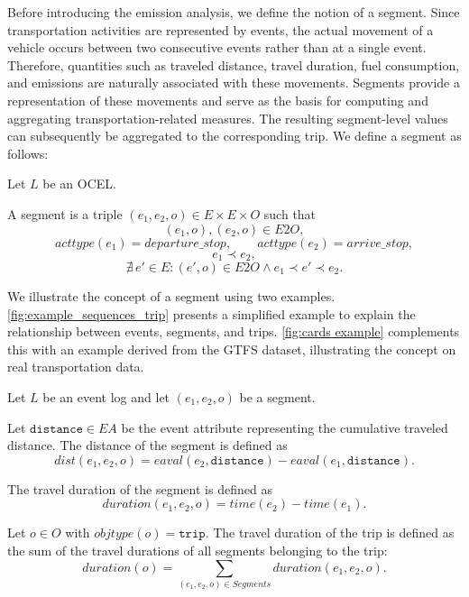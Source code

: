 Before introducing the emission analysis, we define the notion of a segment. Since transportation activities are represented by events, the actual movement of a vehicle occurs between two consecutive events rather than at a single event. Therefore, quantities such as traveled distance, travel duration, fuel consumption, and emissions are naturally associated with these movements. Segments provide a representation of these movements and serve as the basis for computing and aggregating transportation-related measures. The resulting segment-level values can subsequently be aggregated to the corresponding trip. We define a segment as follows: 
\begin{definition}[Segment]
Let $L$ be an OCEL.

A segment is a triple $(e_1,e_2,o)\in E\times E\times O$ such that
\[
(e_1,o),(e_2,o)\in E2O,
\]
\[
\mathit{acttype}(e_1)=\textit{departure\_stop},
\qquad
\mathit{acttype}(e_2)=\textit{arrive\_stop},
\]
\[
e_1 \prec e_2,
\]
\[
\nexists\, e'\in E:
(e',o)\in E2O
\land
e_1\prec e'\prec e_2.
\]
\label{def:segments}
\end{definition}
We illustrate the concept of a segment using two examples. \autoref{fig:example_sequences_trip} presents a simplified example to explain the relationship between events, segments, and trips. \autoref{fig:cards example} complements this with an example derived from the GTFS dataset, illustrating the concept on real transportation data.

\begin{definition}
Let $L$ be an event log and let $(e_1,e_2,o)$ be a segment.

Let $\texttt{distance}\in EA$ be the event attribute representing the cumulative traveled distance. The distance of the segment is defined as
\begin{equation}
dist(e_1,e_2,o)
=
eaval(e_2,\texttt{distance})
-
eaval(e_1,\texttt{distance}).
\end{equation}

The travel duration of the segment is defined as
\begin{equation}
duration(e_1,e_2,o)
=
time(e_2)-time(e_1).
\end{equation}

Let $o\in O$ with $objtype(o)=\texttt{trip}$. The travel duration of the trip is defined as the sum of the travel durations of all segments belonging to the trip:
\begin{equation}
duration(o)
=
\sum_{(e_1,e_2,o)\in Segments}
duration(e_1,e_2,o).
\end{equation}


\end{definition}





